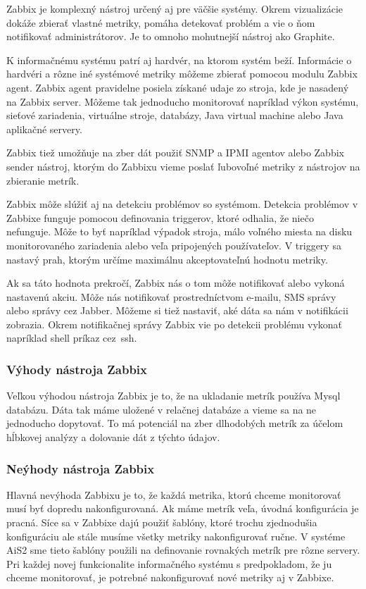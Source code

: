 \documentclass[a4paper, usesections, upjsfrontpage, thesismargins, thesislinespacing]{rnthesis}
\begin{document}
Zabbix je komplexný nástroj určený aj pre väčšie systémy.
Okrem vizualizácie dokáže zbierať vlastné metriky, pomáha detekovať problém a vie o ňom notifikovať administrátorov.
Je to omnoho mohutnejší nástroj ako Graphite.

K informačnému systému patrí aj hardvér, na ktorom systém beží.
Informácie o hardvéri a rôzne iné systémové metriky môžeme zbierať pomocou modulu Zabbix agent.
Zabbix agent pravidelne posiela získané udaje zo stroja, kde je nasadený na Zabbix server.
Môžeme tak jednoducho monitorovať napríklad výkon systému, sieťové zariadenia, virtuálne stroje, databázy, Java virtual machine alebo Java aplikačné servery.

Zabbix tiež umožňuje na zber dát použiť SNMP a IPMI agentov alebo Zabbix sender nástroj, ktorým do Zabbixu vieme poslať ľubovoľné metriky z nástrojov na zbieranie metrík.

Zabbix môže slúžiť aj na detekciu problémov so systémom.
Detekcia problémov v Zabbixe funguje pomocou definovania triggerov, ktoré odhalia, že niečo nefunguje.
Môže to byť napríklad výpadok stroja, málo voľného miesta na disku monitorovaného zariadenia alebo veľa pripojených používateľov.
V triggery sa nastavý prah, ktorým určíme maximálnu akceptovateľnú hodnotu metriky.

Ak sa táto hodnota prekročí, Zabbix nás o tom môže notifikovať alebo vykoná nastavenú akciu.
Môže nás notifikovať prostredníctvom e-mailu, SMS správy alebo správy cez Jabber.
Môžeme si tiež nastaviť, aké dáta sa nám v notifikácii zobrazia.
Okrem notifikačnej správy Zabbix vie po detekcii problému vykonať napríklad shell príkaz cez~ssh.

\subsubsection{Výhody nástroja Zabbix}

Veľkou výhodou nástroja Zabbix je to, že na ukladanie metrík používa Mysql databázu.
Dáta tak máme uložené v relačnej databáze a vieme sa na ne jednoducho dopytovať.
To má potenciál na zber dlhodobých metrík za účelom hĺbkovej analýzy a dolovanie dát z týchto údajov.


\subsubsection{Neýhody nástroja Zabbix}

Hlavná nevýhoda Zabbixu je to, že každá metrika, ktorú chceme monitorovať musí byť dopredu nakonfigurovaná.
Ak máme metrík veľa, úvodná konfigurácia je pracná.
Síce sa v Zabbixe dajú použiť šablóny, ktoré trochu zjednodušia konfiguráciu ale stále musíme všetky metriky nakonfigurovať ručne.
V systéme AiS2 sme tieto šablóny použili na definovanie rovnakých metrík pre rôzne servery.
Pri každej novej funkcionalite informačného systému s predpokladom, že ju chceme monitorovať, je potrebné nakonfigurovať nové metriky aj v Zabbixe.
\end{document}

